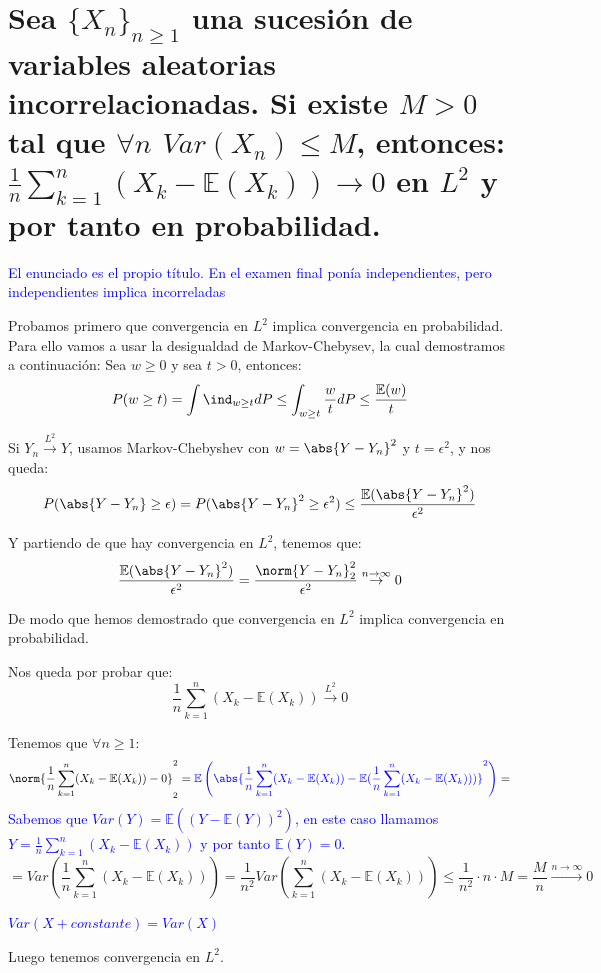 \documentclass{apuntes}
\begin{document}
\section{Sea $\{X_n\}_{n\geq 1}$ una sucesión de variables aleatorias incorrelacionadas. Si existe $M>0$ tal que $\forall n$ $Var(X_n)\leq M$, entonces: $\frac{1}{n}\sum_{k=1}^{n}(X_k -\mathbb{E}(X_k)) \rightarrow 0$ en $L^2$ y por tanto en probabilidad.}

\textcolor{blue}{El enunciado es el propio título. En el examen final ponía independientes, pero independientes implica incorreladas}

Probamos primero que convergencia en $L^2$ implica convergencia en probabilidad. Para ello vamos a usar la desigualdad de Markov-Chebysev, la cual demostramos a continuación: Sea $w \geq 0$ y sea $t>0$, entonces:
\[
P(w \geq t)=\int \ind_{w\geq t} dP \leq \int_{w  \geq t} \frac{w}{t} dP \leq \frac{\mathbb{E}(w)}{t}
\]

Si $Y_n \stackrel{L^2}{\rightarrow} Y$, usamos Markov-Chebyshev con $w=\abs{Y-Y_n}^2$ y $t=\epsilon^2$, y nos queda:
\[
P(\abs{Y-Y_n}\geq \epsilon)=P(\abs{Y-Y_n}^2 \geq \epsilon^2) \leq \frac{\mathbb{E}(\abs{Y-Y_n}^2)}{\epsilon^2}
\]

Y partiendo de que hay convergencia en $L^2$, tenemos que:
\[
\frac{\mathbb{E}(\abs{Y-Y_n}^2)}{\epsilon^2} = \frac{\norm{Y-Y_n}_2^2}{\epsilon^2} \stackrel{n \rightarrow \infty}{\rightarrow} 0
\]

De modo que hemos demostrado que convergencia en $L^2$ implica convergencia en probabilidad.

Nos queda por probar que:
\[
\frac{1}{n}\sum_{k=1}^{n}(X_k -\mathbb{E}(X_k)) \stackrel{L^2}{\rightarrow} 0
\]

Tenemos que $\forall n \geq 1$:
\[
\norm{\frac{1}{n}\sum_{k=1}^{n}(X_k -\mathbb{E}(X_k)) -0}_2^2 = \textcolor{blue}{\mathbb{E}\left(\abs{\frac{1}{n}\sum_{k=1}^{n}(X_k -\mathbb{E}(X_k))-\mathbb{E}(\frac{1}{n}\sum_{k=1}^{n}(X_k -\mathbb{E}(X_k)))}^2\right)}=
\]
\textcolor{blue}{Sabemos que $Var(Y)= \mathbb{E}((Y-\mathbb{E}(Y))^2)$, en este caso llamamos $Y = \frac{1}{n}\sum_{k=1}^{n}(X_k -\mathbb{E}(X_k))$ y por tanto $\mathbb{E}(Y)=0$.}
\[
= Var\left(\frac{1}{n}\sum_{k=1}^{n}(X_k -\mathbb{E}(X_k))\right) = \frac{1}{n^2}Var\left(\sum_{k=1}^{n}(X_k -\mathbb{E}(X_k))\right) \leq \frac{1}{n^2}\cdot n\cdot M = \frac{M}{n} \stackrel{n \rightarrow \infty}{\rightarrow} 0
\]

\textcolor{blue}{$Var(X+constante)=Var(X)$}

Luego tenemos convergencia en $L^2$.
\end{document}
